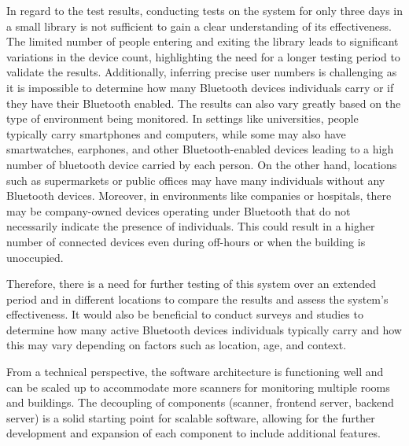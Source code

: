 \documentclass[a4paper, 11pt]{article}
\begin{document}
In regard to the test results, conducting tests on the system for only three days in a small library is not sufficient to gain a clear understanding of its effectiveness. The limited number of people entering and exiting the library leads to significant variations in the device count, highlighting the need for a longer testing period to validate the results. Additionally, inferring precise user numbers is challenging as it is impossible to determine how many Bluetooth devices individuals carry or if they have their Bluetooth enabled. The results can also vary greatly based on the type of environment being monitored. In settings like universities, people typically carry smartphones and computers, while some may also have smartwatches, earphones, and other Bluetooth-enabled devices leading to a high number of bluetooth device carried by each person. On the other hand, locations such as supermarkets or public offices may have many individuals without any Bluetooth devices. Moreover, in environments like companies or hospitals, there may be company-owned devices operating under Bluetooth that do not necessarily indicate the presence of individuals. This could result in a higher number of connected devices even during off-hours or when the building is unoccupied.

Therefore, there is a need for further testing of this system over an extended period and in different locations to compare the results and assess the system's effectiveness. It would also be beneficial to conduct surveys and studies to determine how many active Bluetooth devices individuals typically carry and how this may vary depending on factors such as location, age, and context.

From a technical perspective, the software architecture is functioning well and can be scaled up to accommodate more scanners for monitoring multiple rooms and buildings. The decoupling of components (scanner, frontend server, backend server) is a solid starting point for scalable software, allowing for the further development and expansion of each component to include additional features.
\end{document}

